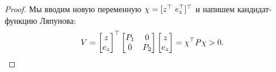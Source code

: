 \begin{proof}
	Мы вводим новую переменную $\chi = [z^\top \ e_z^\top ]^\top$ и напишем кандидат-функцию Ляпунова:
	\begin{equation}
		\label{eq:thm3_Lyapunov_candidat}
		V = \begin{bmatrix}
			z  \\ e_z
		\end{bmatrix}^\top
		\begin{bmatrix}
			{P}_1 & 0 \\
			0 & {P}_2
		\end{bmatrix}
		\begin{bmatrix}
			z \\
			e_z
		\end{bmatrix}
		=
		\chi^\top {P} \chi >0.
	\end{equation}
	

\end{proof}
